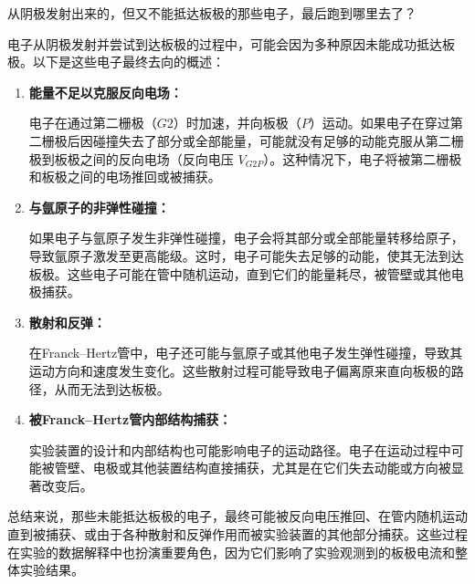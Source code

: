 \documentclass[dvipsnames, svgnames,a4paper,11pt]{article}
\begin{document}
	
	\begin{question}
		从阴极发射出来的，但又不能抵达板极的那些电子，最后跑到哪里去了？
	\end{question}
	电子从阴极发射并尝试到达板极的过程中，可能会因为多种原因未能成功抵达板极。以下是这些电子最终去向的概述：	
	\begin{enumerate}
		\item \textbf{能量不足以克服反向电场：}
		
		电子在通过第二栅极（\( G2 \)）时加速，并向板极（\( P \)）运动。如果电子在穿过第二栅极后因碰撞失去了部分或全部能量，可能就没有足够的动能克服从第二栅极到板极之间的反向电场（反向电压 \( V_{G2P} \)）。这种情况下，电子将被第二栅极和板极之间的电场推回或被捕获。
		
		\item \textbf{与氩原子的非弹性碰撞：}
		
		如果电子与氩原子发生非弹性碰撞，电子会将其部分或全部能量转移给原子，导致氩原子激发至更高能级。这时，电子可能失去足够的动能，使其无法到达板极。这些电子可能在管中随机运动，直到它们的能量耗尽，被管壁或其他电极捕获。
		
		\item \textbf{散射和反弹：}
		
		在Franck–Hertz管中，电子还可能与氩原子或其他电子发生弹性碰撞，导致其运动方向和速度发生变化。这些散射过程可能导致电子偏离原来直向板极的路径，从而无法到达板极。
		
		\item \textbf{被Franck–Hertz管内部结构捕获：}
		
		实验装置的设计和内部结构也可能影响电子的运动路径。电子在运动过程中可能被管壁、电极或其他装置结构直接捕获，尤其是在它们失去动能或方向被显著改变后。
	\end{enumerate}	
	
	总结来说，那些未能抵达板极的电子，最终可能被反向电压推回、在管内随机运动直到被捕获、或由于各种散射和反弹作用而被实验装置的其他部分捕获。这些过程在实验的数据解释中也扮演重要角色，因为它们影响了实验观测到的板极电流和整体实验结果。
	
\end{document}
